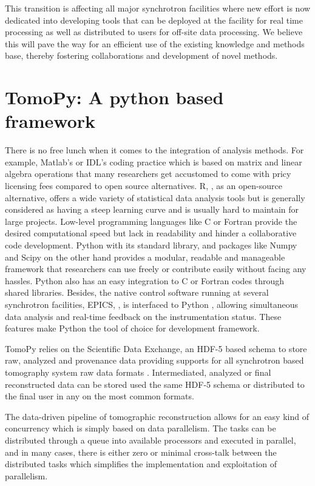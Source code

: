 \documentclass[pdf]{iucr}              %
\begin{document}
This transition is affecting all major synchrotron facilities where new effort is now dedicated into developing tools that can be deployed at the facility for real time processing as well as distributed to users for off-site data processing. We believe this will pave the way for an efficient use of the existing knowledge and methods base, thereby fostering collaborations and development of novel methods.

\section{TomoPy: A python based framework}

There is no free lunch when it comes to the integration of analysis methods. For example, Matlab's or IDL's coding practice which is based on matrix and linear algebra operations that many researchers get accustomed to come with pricy licensing fees compared to open source alternatives. R, \cite{r}, as an open-source alternative, offers a wide variety of statistical data analysis tools but is generally considered as having a steep learning curve and is usually hard to maintain for large projects. Low-level programming languages like C or Fortran provide the desired computational speed but lack in readability and hinder a collaborative code development. Python with its standard library, and packages like Numpy and Scipy on the other hand provides a modular, readable and manageable framework that researchers can use freely or contribute easily without facing any hassles. Python also has an easy integration to C or Fortran codes through shared libraries. Besides, the native  control software running at several synchrotron facilities, EPICS, \cite{epics}, is interfaced to Python \cite{pyepics}, allowing simultaneous data analysis and real-time feedback on the instrumentation status. These features make Python the tool of choice for development framework.

TomoPy relies on the Scientific Data Exchange, an HDF-5 based schema to store raw, analyzed and provenance data providing supports for all synchrotron based tomography system raw data formats \cite{data_exchange}. Intermediated, analyzed or final reconstructed data can be stored used the same HDF-5 schema or distributed to the final user in any on the most common formats. 

The data-driven pipeline of tomographic reconstruction allows for an easy kind of concurrency which is simply based on data parallelism. The tasks can be distributed through a queue into available processors and executed in parallel, and in many cases, there is either zero or minimal cross-talk between the distributed tasks which simplifies the implementation and exploitation of parallelism.
\end{document}
